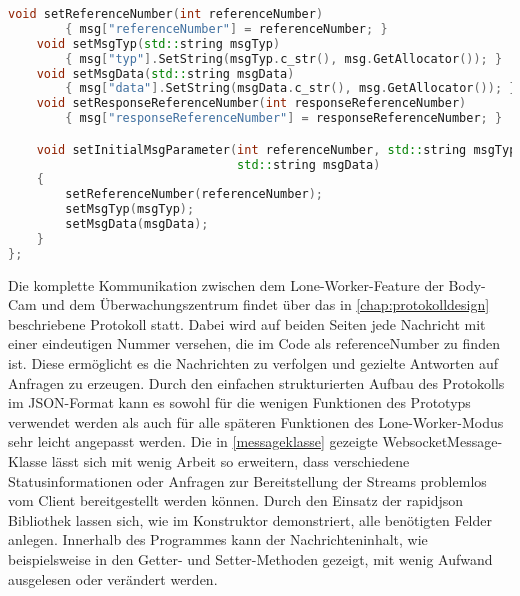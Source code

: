 \documentclass[thesis.tex]{subfiles}
\begin{document}
\begin{lstlisting}[caption={[Nachrichtenklasse im Prototypen]Nachrichtenklasse im Prototypen \lbrack eigene Darstellung\rbrack},captionpos=b,language=C++,label=messageklasse]
    void setReferenceNumber(int referenceNumber)
        { msg["referenceNumber"] = referenceNumber; }
    void setMsgTyp(std::string msgTyp)
        { msg["typ"].SetString(msgTyp.c_str(), msg.GetAllocator()); }
    void setMsgData(std::string msgData)
        { msg["data"].SetString(msgData.c_str(), msg.GetAllocator()); }
    void setResponseReferenceNumber(int responseReferenceNumber)
        { msg["responseReferenceNumber"] = responseReferenceNumber; }

    void setInitialMsgParameter(int referenceNumber, std::string msgTyp,
                                std::string msgData)
    {
        setReferenceNumber(referenceNumber);
        setMsgTyp(msgTyp);
        setMsgData(msgData);
    }
};
\end{lstlisting}

Die komplette Kommunikation zwischen dem Lone-Worker-Feature der Body-Cam und dem Überwachungszentrum findet über das in \autoref{chap:protokolldesign} beschriebene Protokoll statt.
Dabei wird auf beiden Seiten jede Nachricht mit einer eindeutigen Nummer versehen, die im Code als referenceNumber zu finden ist.
Diese ermöglicht es die Nachrichten zu verfolgen und gezielte Antworten auf Anfragen zu erzeugen.
Durch den einfachen strukturierten Aufbau des Protokolls im JSON-Format kann es sowohl für die wenigen Funktionen des Prototyps verwendet werden als auch für alle späteren Funktionen des Lone-Worker-Modus sehr leicht angepasst werden.
Die in \autoref{messageklasse} gezeigte WebsocketMessage-Klasse lässt sich mit wenig Arbeit so erweitern, dass verschiedene Statusinformationen oder Anfragen zur Bereitstellung der Streams problemlos vom Client bereitgestellt werden können.
Durch den Einsatz der rapidjson Bibliothek lassen sich, wie im Konstruktor demonstriert, alle benötigten Felder anlegen.
Innerhalb des Programmes kann der Nachrichteninhalt, wie beispielsweise in den Getter- und Setter-Methoden gezeigt, mit wenig Aufwand ausgelesen oder verändert werden.
\end{document}
